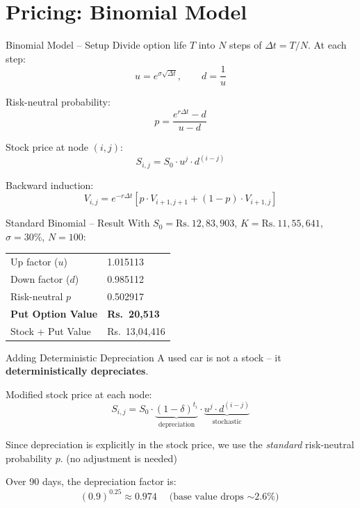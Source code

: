 \documentclass[11pt, aspectratio=43]{beamer}
\begin{document}
\section{Pricing: Binomial Model}

\begin{frame}{Binomial Model -- Setup}
    Divide option life $T$ into $N$ steps of $\Delta t = T/N$. At each step:
    \[
        u = e^{\sigma \sqrt{\Delta t}}, \qquad d = \frac{1}{u}
    \]

    Risk-neutral probability:
    \[
        p = \frac{e^{r \Delta t} - d}{u - d}
    \]

    Stock price at node $(i, j)$:
    \[
        S_{i,j} = S_0 \cdot u^j \cdot d^{(i-j)}
    \]

    Backward induction:
    \[
        V_{i,j} = e^{-r \Delta t} \left[ p \cdot V_{i+1,j+1} + (1-p) \cdot V_{i+1,j} \right]
    \]
\end{frame}


\begin{frame}{Standard Binomial -- Result}
    With $S_0 = \text{Rs.}~12{,}83{,}903$, $K = \text{Rs.}~11{,}55{,}641$, $\sigma = 30\%$, $N = 100$:

    \vspace{0.8em}
    \begin{table}
        \centering
        \begin{tabular}{@{}ll@{}}
            \toprule
            Up factor ($u$) & 1.015113 \\
            Down factor ($d$) & 0.985112 \\
            Risk-neutral $p$ & 0.502917 \\
            \midrule
            \textbf{Put Option Value} & \textbf{Rs.~20,513} \\
            Stock + Put Value & Rs.~13,04,416 \\
            \bottomrule
        \end{tabular}
    \end{table}
\end{frame}


\begin{frame}{Adding Deterministic Depreciation}
    A used car is not a stock -- it \textbf{deterministically depreciates}.

    \vspace{0.5em}
    Modified stock price at each node:
    \[
        S_{i,j} = S_0 \cdot \underbrace{(1 - \delta)^{t_i}}_{\text{depreciation}} \cdot \underbrace{u^j \cdot d^{(i-j)}}_{\text{stochastic}}
    \]

    \vspace{0.5em}
    Since depreciation is explicitly in the stock price, we use the \emph{standard} risk-neutral probability $p$. (no adjustment is needed)

    \vspace{0.5em}
    Over 90 days, the depreciation factor is:
    \[
        (0.9)^{0.25} \approx 0.974 \quad \text{(base value drops $\sim$2.6\%)}
    \]
\end{frame}
\end{document}
